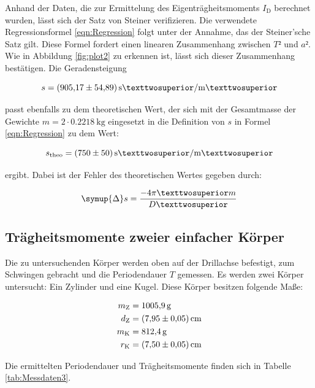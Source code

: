 Anhand der Daten, die zur Ermittelung des Eigenträgheitsmoments $I_\text{D}$ berechnet wurden, lässt sich der
Satz von Steiner verifizieren. Die verwendete Regressionsformel \eqref{eqn:Regression} folgt unter der
Annahme, das der Steiner'sche Satz gilt. Diese Formel fordert einen linearen Zusammenhang zwischen 
$T²$ und $a²$. Wie in Abbildung \ref{fig:plot2} zu erkennen ist, lässt sich dieser Zusammenhang 
bestätigen. Die Geradensteigung

\begin{equation*}
s = \SI{905.17+-54.89}{\second²\per\meter²}
\end{equation*}

passt ebenfalls zu dem theoretischen Wert, der sich mit der Gesamtmasse der Gewichte  $m = 2\cdot 
\SI{0.2218}{\kilo\gram}$ eingesetzt in die Definition von $s$ in Formel \eqref{eqn:Regression} zu 
dem Wert:

\begin{equation*}
s_\text{theo} = \SI{750+-50}{\second²\per\meter²}
\end{equation*}

ergibt.
Dabei ist der Fehler des theoretischen Wertes gegeben durch:

\begin{equation*}
\symup{\Delta} s = \frac{-4\pi²m}{D²} 
\end{equation*}

\subsection{Trägheitsmomente zweier einfacher Körper}

Die zu untersuchenden Körper werden oben auf der Drillachse befestigt, zum Schwingen gebracht 
und die Periodendauer $T$ gemessen. Es werden zwei Körper untersucht: Ein Zylinder und eine Kugel.
Diese Körper besitzen folgende Maße: 

\begin{align*}
m_\text{Z} &= \SI{1005.9}{\gram}\\
d_\text{Z} &= \SI{7.95+-0.05}{\centi\meter}\\
m_\text{K} &= \SI{812.4}{\gram}\\
r_\text{K} &= \SI{7.5+-0.05}{\centi\meter} 
\end{align*}

Die ermittelten Periodendauer und Trägheitsmomente finden sich in Tabelle \ref{tab:Messdaten3}.

